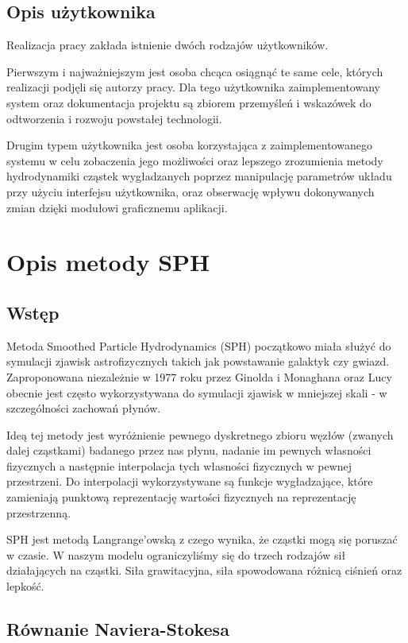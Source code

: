\documentclass[polish, 12pt]{aghthesis}
\begin{document}
\subsection{Opis użytkownika}
	
	Realizacja pracy zakłada istnienie dwóch rodzajów użytkowników.
	
	Pierwszym i najważniejszym jest osoba chcąca osiągnąć te same cele, których realizacji podjęli się autorzy pracy. Dla tego użytkownika zaimplementowany system oraz dokumentacja projektu są zbiorem przemyśleń i wskazówek do odtworzenia i rozwoju powstałej technologii.
	
	Drugim typem użytkownika jest osoba korzystająca z zaimplementowanego systemu w celu zobaczenia jego możliwości oraz lepszego zrozumienia metody hydrodynamiki cząstek wygładzanych poprzez manipulację parametrów układu przy użyciu interfejsu użytkownika, oraz obserwację wpływu dokonywanych zmian dzięki modułowi graficznemu aplikacji.
	
\section{Opis metody SPH}
\subsection{Wstęp}
			
			Metoda Smoothed Particle Hydrodynamics (SPH) początkowo miała służyć do symulacji zjawisk astrofizycznych takich jak powstawanie galaktyk czy gwiazd. Zaproponowana niezależnie w 1977 roku przez Ginolda i Monaghana oraz Lucy obecnie jest często wykorzystywana do symulacji zjawisk w mniejszej skali - w szczególności zachowań płynów. 

			Ideą tej metody jest wyróżnienie pewnego dyskretnego zbioru węzłów (zwanych dalej cząstkami) badanego przez nas płynu, nadanie im pewnych własności fizycznych a następnie interpolacja tych własności fizycznych w pewnej przestrzeni. Do interpolacji wykorzystywane są funkcje wygładzające, które zamieniają punktową reprezentację wartości fizycznych na reprezentację przestrzenną.

			SPH jest metodą Langrange'owską z czego wynika, że cząstki mogą się poruszać w czasie. W naszym modelu ograniczyliśmy się do trzech rodzajów sił działających na cząstki. Siła grawitacyjna, siła spowodowana różnicą ciśnień oraz lepkość.

		\subsection{Równanie Naviera-Stokesa}
\end{document}
